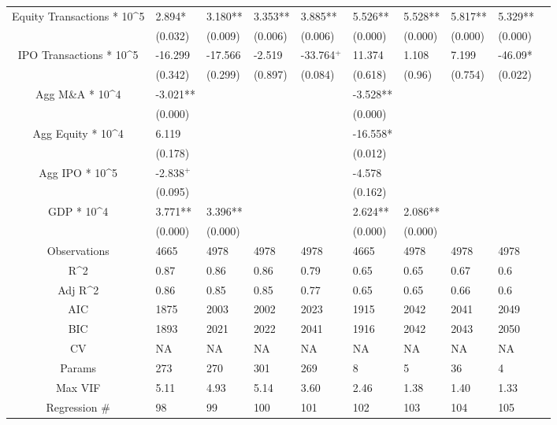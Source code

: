 \documentclass{article}
\begin{document}
\begin{table}[H]
\begin{tabular}{|clllllllll|}
  Equity Transactions * 10^5 & 2.894* & 3.180** & 3.353** & 3.885** & 5.526** & 5.528** & 5.817** & 5.329** & \\
   & (0.032) & (0.009) & (0.006) & (0.006) & (0.000) & (0.000) & (0.000) & (0.000) & \\
  IPO Transactions * 10^5 & -16.299 & -17.566 & -2.519 & -33.764$^{+}$ & 11.374 & 1.108 & 7.199 & -46.09* & \\
   & (0.342) & (0.299) & (0.897) & (0.084) & (0.618) & (0.96) & (0.754) & (0.022) & \\
  Agg M\&A * 10^4 & -3.021** &  &  &  & -3.528** &  &  &  & \\
   & (0.000) &  &  &  & (0.000) &  &  &  & \\
  Agg Equity * 10^4 & 6.119 &  &  &  & -16.558* &  &  &  & \\
   & (0.178) &  &  &  & (0.012) &  &  &  & \\
  Agg IPO * 10^5 & -2.838$^{+}$ &  &  &  & -4.578 &  &  &  & \\
   & (0.095) &  &  &  & (0.162) &  &  &  & \\
  GDP * 10^4 & 3.771** & 3.396** &  &  & 2.624** & 2.086** &  &  & \\
   & (0.000) & (0.000) &  &  & (0.000) & (0.000) &  &  & \\
  \hline
 Observations & 4665 & 4978 & 4978 & 4978 & 4665 & 4978 & 4978 & 4978 & \\
  R^2 & 0.87 & 0.86 & 0.86 & 0.79 & 0.65 & 0.65 & 0.67 & 0.6 & \\
  Adj R^2 & 0.86 & 0.85 & 0.85 & 0.77 & 0.65 & 0.65 & 0.66 & 0.6 & \\
  AIC & 1875 & 2003 & 2002 & 2023 & 1915 & 2042 & 2041 & 2049 & \\
  BIC & 1893 & 2021 & 2022 & 2041 & 1916 & 2042 & 2043 & 2050 & \\
  CV & NA & NA & NA & NA & NA & NA & NA & NA & \\
  Params & 273 & 270 & 301 & 269 & 8 & 5 & 36 & 4 & \\
  Max VIF & 5.11 & 4.93 & 5.14 & 3.60 & 2.46 & 1.38 & 1.40 & 1.33 & \\
  Regression \# & 98 & 99 & 100 & 101 & 102 & 103 & 104 & 105 & \\
   \hline
\end{tabular}

\end{table}
\end{document}
